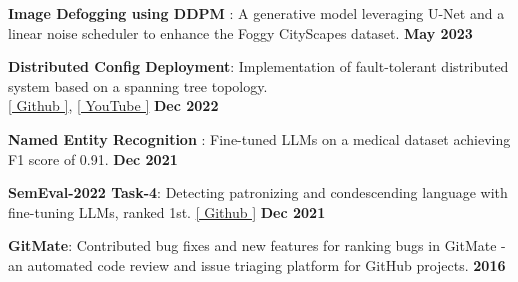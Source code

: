 \begin{zitemize}
\item \textbf{Image Defogging using DDPM} : A generative model leveraging U-Net and a linear noise scheduler to enhance the Foggy CityScapes dataset.  \hfill \textbf{May 2023}
\item \textbf{Distributed Config Deployment}: Implementation of fault-tolerant distributed system based on a spanning tree topology. \\ \href{https://github.com/tushar-rishav/CSCI5273_Final_Project}{[ Github ]}, \href{https://www.youtube.com/watch?v=tZjVTBsGzvQ}{[ YouTube ]}  \hfill \textbf{Dec 2022}
\item \textbf{Named Entity Recognition} : Fine-tuned LLMs on a medical dataset achieving F1 score of 0.91.  \hfill \textbf{Dec 2021}
\item \textbf{SemEval-2022 Task-4}: Detecting patronizing and condescending language with fine-tuning LLMs, ranked 1st. \href{https://github.com/tushar-rishav/SemEval-2022}{[ Github ]} \hfill \textbf{Dec 2021}
\item  \textbf{GitMate}: Contributed bug fixes and new features for ranking bugs in GitMate - an automated code review and issue triaging platform for GitHub projects.  \hfill \textbf{2016}
\vspace{1mm}
\end{zitemize}


